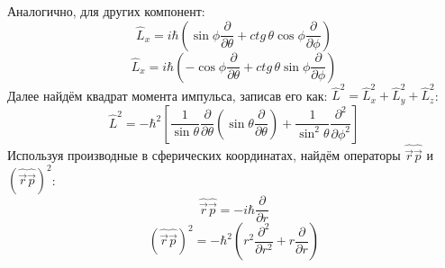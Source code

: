 Аналогично, для других компонент:
\[
\hat{L}_x = i\hbar\left(\sin\phi\frac{\partial}{\partial \theta} + ctg\,\theta\cos\phi \frac{\partial}{\partial \phi}\right)
\]
\[
\hat{L}_x = i\hbar\left(-\cos\phi\frac{\partial}{\partial \theta} + ctg\,\theta\sin\phi \frac{\partial}{\partial \phi}\right)
\]
Далее найдём квадрат момента импульса, записав его как: $\hat{L}^2 = \hat{L}^2_x + \hat{L}^2_y + \hat{L}^2_z$:
\[
\hat{L}^2 = -\hbar^2\left[\frac{1}{\sin\theta}\frac{\partial}{\partial \theta}\left( \sin\theta\frac{\partial}{\partial \theta} \right) + \frac{1}{\sin^2\theta}\frac{\partial^2}{\partial\phi^2}\right]
\]
Используя производные в сферических координатах, найдём операторы $\hat{\Vec{r}}\hat{\Vec{p}}$ и $(\hat{\Vec{r}}\hat{\Vec{p}})^2$:
\[
\hat{\Vec{r}}\hat{\Vec{p}} = -i\hbar\frac{\partial}{\partial r}
\]
\[
(\hat{\Vec{r}}\hat{\Vec{p}})^2 = -\hbar^2\left( r^2\frac{\partial^2}{\partial r^2} + r\frac{\partial}{\partial r}\right)
\]

